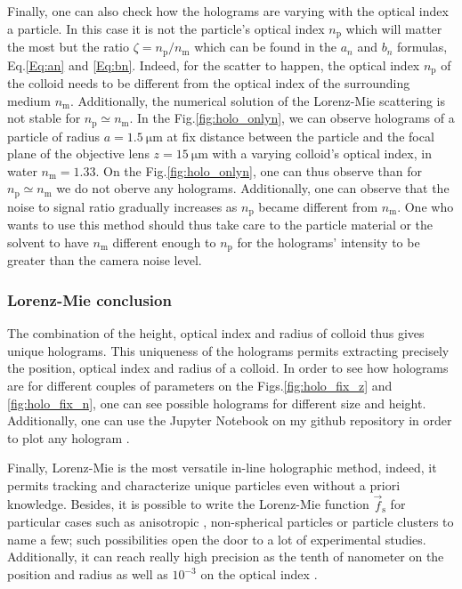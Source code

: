 Finally, one can also check how the holograms are varying with the optical index a particle. In this case it is not the particle's optical index $n_\mathrm{p}$ which will matter the most but the ratio $\zeta = n_\mathrm{p} / n_\mathrm{m} $ which can be found in the $a_n$ and $b_n$ formulas, Eq.\ref{Eq:an} and \ref{Eq:bn}. Indeed, for the scatter to happen, the optical index $n_\mathrm{p}$ of the colloid needs to be different from the optical index of the surrounding medium $n_\mathrm{m}$. Additionally, the numerical solution of the Lorenz-Mie scattering is not stable for $n_\mathrm{p} \simeq n_\mathrm{m}$. In the Fig.\ref{fig:holo_onlyn}, we can observe holograms of a particle of radius $a = 1.5 ~ \mathrm{\mu m}$ at fix distance between the particle and the focal plane of the objective lens $z=15 ~ \mathrm{\mu m}$ with a varying colloid's optical index, in water $n_\mathrm{m} = 1.33$. On the Fig.\ref{fig:holo_onlyn}, one can thus observe than for  $n_\mathrm{p} \simeq n_\mathrm{m}$ we do not oberve any holograms.  Additionally, one can observe that the noise to signal ratio gradually increases as $n_\mathrm{p}$ became different from $n_\mathrm{m}$. One who wants to use this method should thus take care to the particle material or the solvent to have $n_\mathrm{m}$ different enough to  $n_\mathrm{p}$ for the holograms' intensity to be greater than the camera noise level.






\subsubsection{Lorenz-Mie conclusion}

The combination of the height, optical index and radius of colloid thus gives unique holograms. This uniqueness of the holograms permits extracting precisely the position, optical index and radius of a colloid. In order to see how holograms are for different couples of parameters on the Figs.\ref{fig:holo_fix_z} and \ref{fig:holo_fix_n}, one can see possible holograms for different size and height. Additionally, one can use  the Jupyter Notebook on my github repository in order to plot any hologram \href{https://github.com/eXpensia/Ma-these/blob/main/02_body/chapter2/images/holo_size_exemple/holosize_variation.ipynb}{\faGithub}.  

Finally, Lorenz-Mie is the most versatile in-line holographic method, indeed, it permits tracking and characterize unique particles even without a priori knowledge. Besides, it is possible to write the Lorenz-Mie function $\vec{f}_\mathrm{s}$ for particular cases such as anisotropic \cite{fung_holographic_2013}, non-spherical particles \cite{wang_using_2014} or particle clusters \cite{fung_holographic_2013, perry_real-space_2013} to name a few; such possibilities open the door to a lot of experimental studies. Additionally, it can reach really high precision as the tenth of nanometer on the position and radius as well as $10^{-3}$ on the optical index \cite{lee_characterizing_2007}. 

